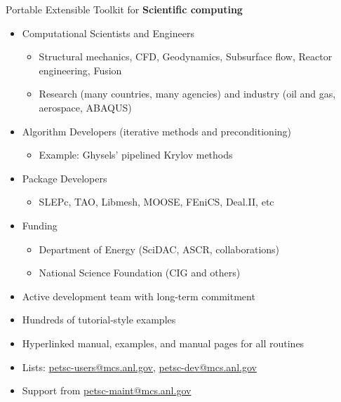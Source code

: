 \documentclass{beamer}
\begin{document}
\begin{frame}{Portable Extensible Toolkit for {\bf Scientific computing}}
  \begin{itemize}
  \item Computational Scientists and Engineers
    \begin{itemize}
    \item Structural mechanics, CFD, Geodynamics, Subsurface flow, Reactor engineering, Fusion
    \item Research (many countries, many agencies) and industry (oil and gas, aerospace, ABAQUS)
    \end{itemize}
  \item Algorithm Developers (iterative methods and preconditioning)
    \begin{itemize}
    \item Example: Ghysels' pipelined Krylov methods
    \end{itemize}
  \item Package Developers
    \begin{itemize}
    \item SLEPc, TAO, Libmesh, MOOSE, FEniCS, Deal.II, etc
    \end{itemize}
  \item Funding
    \begin{itemize}
    \item Department of Energy (SciDAC, ASCR, collaborations)
    \item National Science Foundation (CIG and others)
    \end{itemize}
  \item Active development team with long-term commitment
  \item Hundreds of tutorial-style examples
  \item Hyperlinked manual, examples, and manual pages for all routines
  \item Lists: \url{petsc-users@mcs.anl.gov}, \url{petsc-dev@mcs.anl.gov}
  \item Support from \url{petsc-maint@mcs.anl.gov}
\end{itemize}
\end{frame}
\end{document}
